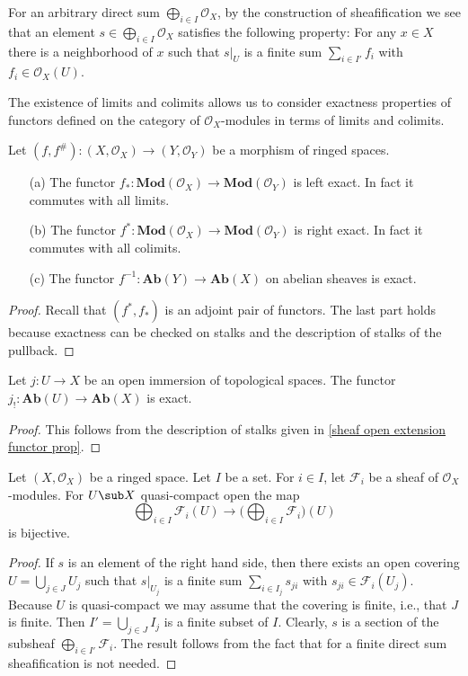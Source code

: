 \begin{remark}
For an arbitrary direct sum $\bigoplus_{i\in I}\mathscr{O}_X$, by the construction of sheafification we see that an element $s\in\bigoplus_{i\in I}\mathscr{O}_X$ satisfies the following property: For any $x\in X$ there is a neighborhood of $x$ such that $s|_U$ is a finite sum $\sum_{i\in I'}f_i$ with $f_i\in\mathscr{O}_X(U)$.
\end{remark}
The existence of limits and colimits allows us to consider exactness properties of functors defined on the category of $\mathscr{O}_X$-modules in terms of limits and colimits.
\begin{proposition}\label{ringed space morphism pullback pushforward exactness}
Let $(f,f^{\#}):(X,\mathscr{O}_X)\to(Y,\mathscr{O}_Y)$ be a morphism of ringed spaces.
\begin{itemize}
\item[(a)] The functor $f_*:\mathbf{Mod}(\mathscr{O}_X)\to\mathbf{Mod}(\mathscr{O}_Y)$ is left exact. In fact it commutes with all limits.
\item[(b)] The functor $f^*:\mathbf{Mod}(\mathscr{O}_X)\to\mathbf{Mod}(\mathscr{O}_Y)$ is right exact. In fact it commutes with all colimits.
\item[(c)] The functor $f^{-1}:\mathbf{Ab}(Y)\to\mathbf{Ab}(X)$ on abelian sheaves is exact.
\end{itemize}
\end{proposition}
\begin{proof}
Recall that $(f^*,f_*)$ is an adjoint pair of functors. The last part holds because exactness can be checked on stalks and the description of stalks of the pullback.
\end{proof}
\begin{proposition}
Let $j:U\to X$ be an open immersion of topological spaces. The functor $j_!:\mathbf{Ab}(U)\to\mathbf{Ab}(X)$ is exact.
\end{proposition}
\begin{proof}
This follows from the description of stalks given in \cref{sheaf open extension functor prop}.
\end{proof}
\begin{proposition}\label{sheaf module quasi-compact sum}
Let $(X,\mathscr{O}_X)$ be a ringed space. Let $I$ be a set. For $i\in I$, let $\mathscr{F}_i$ be a sheaf of $\mathscr{O}_X$-modules. For $U\sub X$ quasi-compact open the map 
\[\bigoplus_{i\in I}\mathscr{F}_i(U)\to\Big(\bigoplus_{i\in I}\mathscr{F}_i\Big)(U)\]
is bijective.
\end{proposition}
\begin{proof}
If $s$ is an element of the right hand side, then there exists an open covering $U=\bigcup_{j\in J}U_j$ such that $s|_{U_j}$ is a finite sum $\sum_{i\in I_j}s_{ji}$ with $s_{ji}\in\mathscr{F}_i(U_j)$. Because $U$ is quasi-compact we may assume that the covering is finite, i.e., that $J$ is finite. Then $I'=\bigcup_{j\in J}I_j$ is a finite subset of $I$. Clearly, $s$ is a section of the subsheaf $\bigoplus_{i\in I'}\mathscr{F}_i$. The result follows from the fact that for a finite direct sum sheafification
is not needed.
\end{proof}
